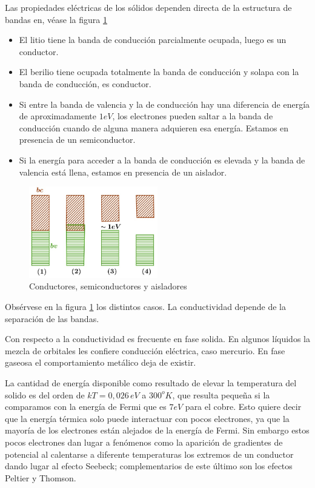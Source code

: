 Las propiedades eléctricas de los sólidos dependen directa de la estructura de bandas en, véase la figura \ref{fig:344}

\begin{itemize}
	\item[1] El litio tiene la banda de conducción parcialmente ocupada, luego es un conductor.
	
	\item[2] El berilio tiene ocupada totalmente la banda de conducción y solapa con la banda de conducción, es conductor.
	
	\item[3] Si entre la banda de valencia y la de conducción hay una diferencia de
energía de aproximadamente $1eV$, los electrones pueden saltar a la banda de conducción cuando de alguna manera adquieren esa energía. Estamos en presencia de un semiconductor.

	\item[4] Si la energía para acceder a la banda de conducción es elevada y la banda de valencia está llena, estamos en presencia de un aislador.

\end{itemize}


\begin{figure}[H]
    \centering
    \includegraphics[width=0.5\textwidth]{./Figures/fig344}
	\caption{Conductores, semiconductores y aisladores}
	\label{fig:344}
\end{figure}

Obsérvese en la figura \ref{fig:344} los distintos casos. La conductividad depende de la separación de las bandas. 

Con respecto a la conductividad es frecuente en fase solida. En algunos líquidos la mezcla de orbitales les confiere conducción eléctrica, caso mercurio. En fase gaseosa el comportamiento metálico deja de existir.

La cantidad de energía disponible como resultado de elevar la temperatura del solido es del orden de $kT=0,026\, eV$ a $300^{o}K$, que resulta pequeña si la comparamos con la energía de Fermi que es $7eV$ para el cobre. Esto quiere decir que la energía térmica solo puede interactuar con pocos electrones, ya que la mayoría de los electrones están alejados de la energía de Fermi. Sin embargo estos pocos electrones
dan lugar a fenómenos como la aparición de gradientes de potencial al calentarse a diferente temperaturas los extremos de un conductor dando lugar al efecto Seebeck; complementarios de este último son los efectos Peltier y Thomson.

